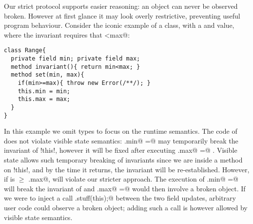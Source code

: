 Our strict protocol supports easier reasoning: an object can never be observed broken. However 
at first glance it may look overly restrictive, preventing useful program behaviour.
Consider the iconic example of a \Q@Range@ class, with a \Q@min@ and \Q@max@
value, where the invariant requires that \Q@min<max@:
\begin{lstlisting}
class Range{ 
  private field min; private field max;
  method invariant(){ return min<max; }
  method set(min, max){
    if(min>=max){ throw new Error(/**/); }
    this.min = min;
    this.max = max;
  }
}
\end{lstlisting}
In this example we omit types to focus on the runtime semantics.
The code of \Q@set@ does not violate visible state semantics:
\Q@this.min@ \Q@=@ \Q@min@ may temporarily break the invariant of \Q!this!, however it will be fixed after executing \Q@this.max@ \Q@=@ \Q@max@. Visible state allows such temporary breaking of invariants since we are inside a method on \Q!this!, and by the time it returns, the invariant will be re-established.
However, if \Q@min@ is $\geq$ \Q@this.max@, \Q@set@ will violate our stricter approach. The execution of
\Q@this.min@ \Q@=@ \Q@min@ will break the invariant of \Q@this@ and \Q@this.max@ \Q@=@ \Q@max@ would then involve a broken object. If we were to inject a call
\Q@Do.stuff(this);@ between the two field updates, arbitrary user code could observe a broken object; 
  adding such a call is however allowed by visible state semantics.


